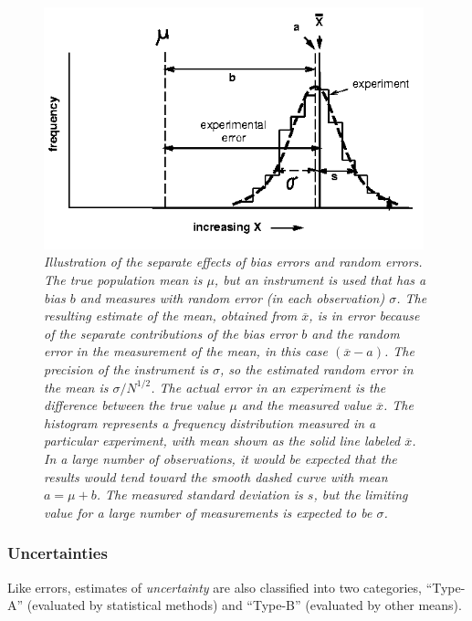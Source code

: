 \documentclass[12pt,twoside,english]{article}\usepackage[]{graphicx}\usepackage[]{color}
\begin{document}
\begin{figure}[H] 
\noindent \begin{centering}
\includegraphics[width=11cm]{SpecialGraphics/A-figure1.png}  
\par\end{centering}

\protect\caption[Illustration of the separate effects of bias errors and random errors.]{\emph{\label{fig:IllustrationOfTerms}Illustration of the separate effects of bias errors and random errors. The true population mean is $\mu$, but an instrument is used that has a bias $b$ and measures with random error (in each observation) $\sigma$. The resulting estimate of the mean, obtained from $\overline{x}$, is in error because of the separate contributions of the bias error $b$ and the random error in the measurement of the mean, in this case $(\overline{x}-a)$. The precision of the instrument is $\sigma$, so the estimated random error in the mean is $\sigma/{N}^{1/2}$. The actual error in an experiment is the difference between the true value $\mu$ and the measured value $\overline{x}$. The histogram represents a frequency distribution measured in a particular experiment, with mean shown as the solid line labeled $\overline{x}$. In a large number of observations, it would be expected that the results would tend toward the smooth dashed curve with mean $a=\mu+b$. The measured standard deviation is $s$, but the limiting value for a large number of measurements is expected to be $\sigma$.} } 


\end{figure}

\subsubsection{Uncertainties}

Like errors, estimates of \emph{uncertainty} are also classified into two categories, ``Type-A'' (evaluated by statistical methods) and ``Type-B'' (evaluated by other means). 
\end{document}
